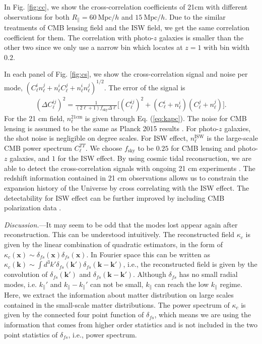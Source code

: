 \documentclass[aps,prl,twocolumn,showpacs,superscriptaddress,groupedaddress,nofootinbib,floatfix]{revtex4}  %
\newcommand{\mr}{\mathrm}
\begin{document}
In Fig. \ref{fig:cc}, we show the cross-correlation coefficients of 21cm with 
different observations for both $R_\parallel=60\ \mr{Mpc}/h$ and 
$15\ \mr{Mpc}/h$. Due to the similar treatments of CMB lensing field
and the ISW field, we get the same correlation coefficient for them. 
The correlation with photo-$z$ galaxies is smaller than the other
two since we only use a narrow bin which locates at $z=1$ with bin width $0.2$.

In each panel of Fig. \ref{fig:cs}, we show the cross-correlation signal and 
noise per mode, 
$(C_\ell^in_\ell^j+n_\ell^iC_\ell^j+n^i_\ell n^j_\ell)^{1/2}$.
The error of the signal is 
\begin{eqnarray}
(\Delta C_\ell^{ij})^2=\frac{1}{(2\ell+1)f_\mr{sky}\Delta\ell}
\bigg[{(C_\ell^{ij})^2+(C_\ell^{i}+n_\ell^{i})
(C_\ell^{j}+n_\ell^{j})}\bigg].
\end{eqnarray}
For the 21 cm field, $n_\ell^\mr{21cm}$ is given through Eq. (\ref{eq:kapc}). 
The noise for CMB lensing is assumed to be the same as Planck 2015 results 
\cite{2015:plancklensing}. For photo-$z$ galaxies, the shot noise is negligible
on degree scales. For ISW effect, $n_\ell^\mr{ISW}$ is the large-scale
CMB power spectrum $C_\ell^{TT}$. We choose $f_\mr{sky}$ to be $0.25$ for 
CMB lensing and photo-$z$ galaxies, and $1$ for the ISW effect. By
using cosmic tidal reconsruction, we are able to detect the cross-correlation
signals with ongoing 21 cm experiments \cite{2014SPIE.9145E..22B,2015ApJ...798...40X,HIRAX}. 
The redshift information contained in 21 cm observations allows us to constrain
the expansion history of the Universe by cross correlating with the ISW effect.
The detectability for ISW effect can be further improved by including CMB 
polarization data \cite{2011PhRvD..83f3001L}.

{\it Discussion.}---It may seem to be odd that the modes lost appear again
after reconstruction. This can be understood intuitively.
The reconstructed field $\kappa_c$ is given by the linear combination of 
quadratic estimators, in the form of 
$\kappa_c(\bm{x})\sim\delta_{fs}(\bm{x})\delta_{fs}(\bm{x})$. In Fourier 
space this can be written as $\kappa_c(\bm{k})\sim\int d^3k'
\delta_{fs}(\bm{k}')\delta_{fs}(\bm{k}-\bm{k}')$, i.e., the reconstructed 
field is given by the convolution of $\delta_{fs}(\bm{k}')$ and 
$\delta_{fs}(\bm{k}-\bm{k}')$. Although $\delta_{fs}$ has no small radial
modes, i.e. $k_{\parallel}'$ and $k_\parallel-k_{\parallel}'$ can not be small,
$k_\parallel$ can reach the low $k_\parallel$ regime.
Here, we extract the information about matter distribution on large scales 
contained in the small-scale matter distributions. The power spectrum of 
$\kappa_c$ is given by the connected four point function of $\delta_{fs}$,
which means we are using the information that comes from higher order statistics
and is not included in the two point statistics of $\delta_{fs}$, i.e., 
power spectrum.
\end{document}
